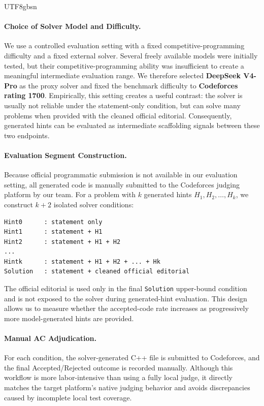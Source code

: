 \documentclass{article}
\begin{document}
\begin{CJK*}{UTF8}{gbsn}
\paragraph{Choice of Solver Model and Difficulty.}
We use a controlled evaluation setting with a fixed competitive-programming difficulty and a fixed external solver. Several freely available models were initially tested, but their competitive-programming ability was insufficient to create a meaningful intermediate evaluation range. We therefore selected \textbf{DeepSeek V4-Pro} as the proxy solver and fixed the benchmark difficulty to \textbf{Codeforces rating 1700}. Empirically, this setting creates a useful contrast: the solver is usually not reliable under the statement-only condition, but can solve many problems when provided with the cleaned official editorial. Consequently, generated hints can be evaluated as intermediate scaffolding signals between these two endpoints.

\paragraph{Evaluation Segment Construction.}

Because official programmatic submission is not available in our evaluation setting, all generated code is manually submitted to the Codeforces judging platform by our team. For a problem with $k$ generated hints $H_1, H_2, \dots, H_k$, we construct $k+2$ isolated solver conditions:

\begin{verbatim}
Hint0      : statement only
Hint1      : statement + H1
Hint2      : statement + H1 + H2
...
Hintk      : statement + H1 + H2 + ... + Hk
Solution   : statement + cleaned official editorial
\end{verbatim}

The official editorial is used only in the final \texttt{Solution} upper-bound condition and is not exposed to the solver during generated-hint evaluation. This design allows us to measure whether the accepted-code rate increases as progressively more model-generated hints are provided.

\paragraph{Manual AC Adjudication.}

For each condition, the solver-generated C++ file is submitted to Codeforces, and the final Accepted/Rejected outcome is recorded manually. Although this workflow is more labor-intensive than using a fully local judge, it directly matches the target platform's native judging behavior and avoids discrepancies caused by incomplete local test coverage.


\end{CJK*}
\end{document}
